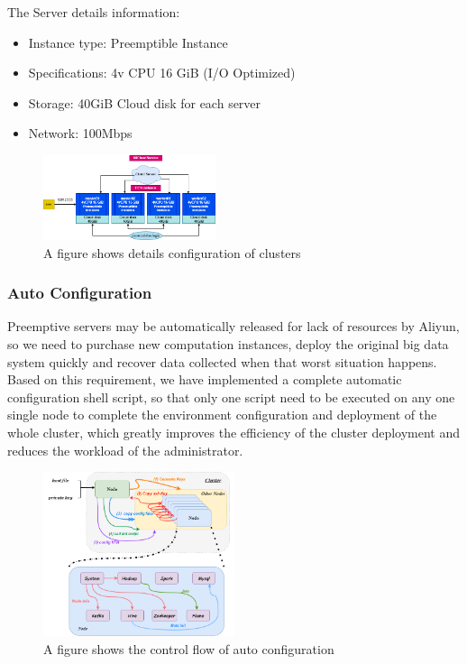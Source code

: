 The Server details information:
\begin{itemize}
    \item Instance type: Preemptible Instance
    \item Specifications: 4v CPU 16 GiB (I/O Optimized)
    \item Storage: 40GiB Cloud disk for each server
    \item Network: 100Mbps
\end{itemize}



\begin{figure}[H]
    \centering
    \includegraphics[width=0.45\textwidth]{./pic/server-info.png}
    \caption{A figure shows details configuration of clusters}
    \label{fig:server-info}
\end{figure}



\subsubsection{Auto Configuration}
Preemptive servers may be automatically released for lack of resources by Aliyun, so we need to purchase new computation instances, deploy the original big data system quickly and recover data collected when that worst situation happens. Based on this requirement, we have implemented a complete automatic configuration shell script, so that only one script need to be executed on any one single node to complete the environment configuration and deployment of the whole cluster, which greatly improves the efficiency of the cluster deployment and reduces the workload of the administrator.


\begin{figure}[H]
    \centering
    \includegraphics[width=0.5\textwidth]{./pic/autoconfig.png}
    \caption{A figure shows the control flow of auto configuration}
    \label{fig:autoconfig}
\end{figure}

